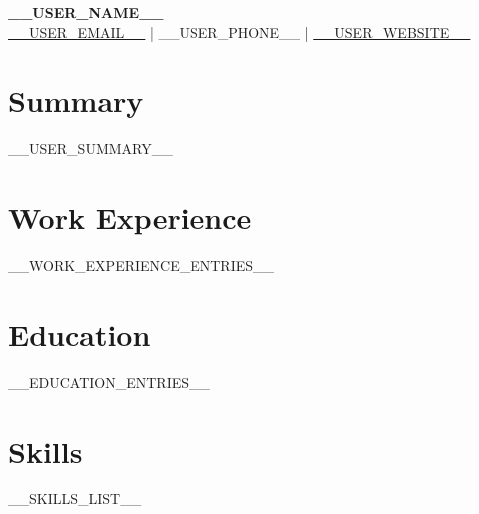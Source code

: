 \documentclass{article}
\begin{document}
\begin{center}
    {\Huge \bfseries __USER_NAME__}
    \vspace{2mm} \\
    \href{mailto:__USER_EMAIL__}{__USER_EMAIL__} | __USER_PHONE__ | \href{http://__USER_WEBSITE__}{__USER_WEBSITE__}
\end{center}

\section*{Summary}
__USER_SUMMARY__

\section*{Work Experience}
\begin{itemize}[leftmargin=*]
    __WORK_EXPERIENCE_ENTRIES__
\end{itemize}

\section*{Education}
\begin{itemize}[leftmargin=*]
    __EDUCATION_ENTRIES__
\end{itemize}

\section*{Skills}
__SKILLS_LIST__
\end{document}
